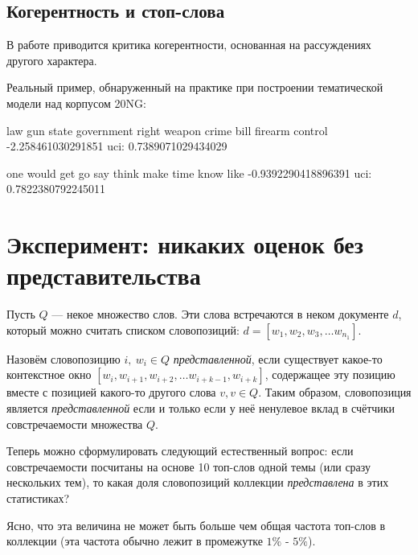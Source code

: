 


\subsection{Когерентность и стоп-слова}

В работе \cite{fan2019assessing} приводится критика когерентности, основанная на рассуждениях другого характера.


Реальный пример, обнаруженный на практике при построении тематической модели над корпусом 20NG:

law gun state government right weapon crime bill firearm control
-2.258461030291851
uci: 0.7389071029434029

one would get go say think make time know like
-0.9392290418896391
uci: 0.7822380792245011



\section{Эксперимент: никаких оценок без представительства}

Пусть $Q$ --- некое множество слов. Эти слова встречаются в неком документе $d$, который можно считать списком словопозиций: $d = [w_1, w_2, w_3, \dots w_{n_1}]$.

Назовём словопозицию $i, ~w_i \in Q$ \textit{представленной}, если существует какое-то контекстное окно $[w_i, w_{i+1}, w_{i+2}, \dots w_{i+k-1}, w_{i+k}]$, содержащее эту позицию вместе с позицией какого-то другого слова $v, v \in Q$. Таким образом, словопозиция является \textit{представленной} если и только если у неё ненулевое вклад в счётчики совстречаемости множества $Q$.

Теперь можно сформулировать следующий естественный вопрос: если совстречаемости посчитаны на основе 10 топ-слов одной темы (или сразу нескольких тем), то какая доля словопозиций коллекции \textit{представлена} в этих статистиках?

Ясно, что эта величина не может быть больше чем общая частота топ-слов в коллекции (эта частота обычно лежит в промежутке $1\%$ - $5\%$).

